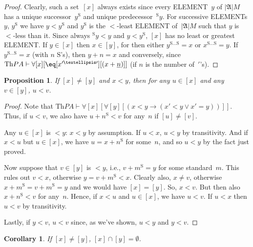 \documentclass[10pt,a4paper]{article}
\newcommand*{\olup}[1]{\MakeUppercase{#1}}
\theoremstyle{plain}
\newtheorem{prop}[thm]{Proposition}
\newtheorem{cor}[thm]{Corollary}
\theoremstyle{definition}
\theoremstyle{remark}
\providecommand{\lif}{\mathbin{\rightarrow}}
\providecommand{\lforall}{\mathord{\forall}}
\providecommand{\Proves}{\mathrel{\vdash}}
\providecommand{\Domain}{\ensuremath{|\mathfrak{A}|}}
\providecommand{\Th}{\ensuremath{\mathrm{Th}}}
\providecommand{\num}[1]{\underline{#1}}
\providecommand{\nssucc}{\mathrm{S}}
\providecommand{\nsplus}{\mathbin{+}}
\providecommand{\nsless}{<}
\begin{document}
\begin{proof}
Clearly, such a set~$[x]$ always exists since every \olup{element}~$y$ of
$\Domain{M}$ has a unique successor~$y^\nssucc$ and unique
predecessor~$^\nssucc y$. For successive \olup{element}s $y$, $y^\nssucc$
we have $y \nsless y^\nssucc$ and $y^\nssucc$ is the $\nsless$-least
\olup{element} of~$\Domain{M}$ such that $y$ is $\nsless$-less than it.
Since always $^\nssucc y \nsless y$ and $y \nsless y^\nssucc$, $[x]$
has no least or greatest \olup{element}. If $y \in [x]$ then $x \in [y]$,
for then either $y^{\nssucc\dots\nssucc} = x$ or
$x^{\nssucc\dots\nssucc} = y$.  If $y^{\nssucc\dots\nssucc} = x$ (with
$n$ $\nssucc$'s), then $y \nsplus n = x$ and conversely, since
$\Th{PA} \Proves \lforall[x][\eq[x^{\prime\dots\prime}][(x +
    \num{n})]]$ (if $n$ is the number of~$\prime$'s).
\end{proof}

\begin{prop}
If $[x] \neq [y]$ and $x \nsless y$, then for any $u \in [x]$ and any
$v \in [y]$, $u \nsless v$.
\end{prop}

\begin{proof}
Note that $\Th{PA} \Proves \lforall[x][\lforall[y][(x < y \lif (x' < y
    \lor x' = y))]]$. Thus, if $u \nsless v$, we also have $u \nsplus
n^\nssucc \nsless v$ for any~$n$ if $[u] \neq [v]$.

Any $u \in [x]$ is $\nsless y$: $x \nsless y$ by assumption. If $u
\nsless x$, $u \nsless y$ by transitivity. And if $x \nsless u$ but $u
\in [x]$, we have $u = x\nsplus n^\nssucc$ for some~$n$, and so $u
\nsless y$ by the fact just proved.
  
Now suppose that $v \in [y]$ is $\nsless y$, i.e., $v \nsplus
m^\nssucc = y$ for some standard~$m$. This rules out $v \nsless x$,
otherwise $y = v \nsplus m^\nssucc \nsless x$. Clearly also, $x \neq
v$, otherwise $x \nsplus m^\nssucc = v \nsplus m^\nssucc = y$ and we
would have $[x] = [y]$. So, $x \nsless v$. But then also $x \nsplus
n^\nssucc \nsless v$ for any~$n$. Hence, if $x \nsless u$ and $u \in
[x]$, we have $u \nsless v$. If $u \nsless x$ then $u \nsless v$ by
transitivity.

Lastly, if $y \nsless v$, $u \nsless v$ since, as we've shown, $u
\nsless y$ and $y \nsless v$.
\end{proof}

\begin{cor}
If $[x] \neq [y]$, $[x] \cap [y] = \emptyset$.
\end{cor}
\end{document}
